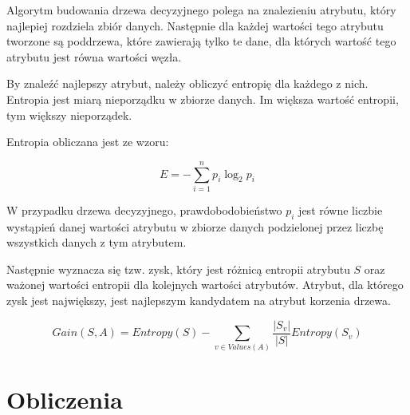 \documentclass{article}
\begin{document}
Algorytm budowania drzewa decyzyjnego polega na
znalezieniu atrybutu, który najlepiej rozdziela
zbiór danych. Następnie dla każdej wartości
tego atrybutu tworzone są poddrzewa, które
zawierają tylko te dane, dla których wartość
tego atrybutu jest równa wartości węzła.

By znaleźć najlepszy atrybut, należy obliczyć
entropię dla każdego z nich. Entropia jest
miarą nieporządku w zbiorze danych. Im większa
wartość entropii, tym większy nieporządek.

Entropia obliczana jest ze wzoru:

\begin{equation}
    E = -\sum_{i=1}^{n} p_i \log_2 p_i
\end{equation}

W przypadku drzewa decyzyjnego, prawdobodobieństwo
$p_i$ jest równe liczbie wystąpień danej wartości
atrybutu w zbiorze danych podzielonej przez
liczbę wszystkich danych z tym atrybutem.

Następnie wyznacza się tzw. zysk,
który jest różnicą entropii atrybutu $S$
oraz ważonej wartości entropii dla kolejnych wartości
atrybutów. Atrybut, dla którego
zysk jest największy, jest najlepszym
kandydatem na atrybut korzenia drzewa.

\begin{equation}
    Gain(S, A) = Entropy(S) - \sum_{v \in Values(A)} \frac{|S_v|}{|S|} Entropy(S_v)
\end{equation}

\section{Obliczenia}
\end{document}
